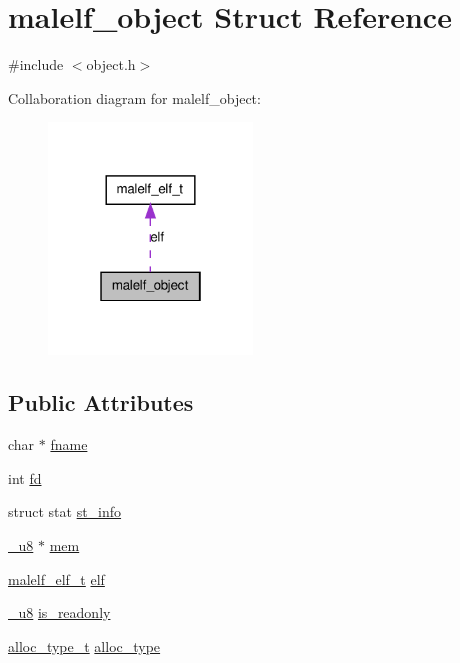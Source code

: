 \hypertarget{structmalelf__object}{
\section{malelf\_\-object Struct Reference}
\label{structmalelf__object}
}


{\ttfamily \#include $<$object.h$>$}



Collaboration diagram for malelf\_\-object:\nopagebreak
\begin{figure}[H]
\begin{center}
\leavevmode
\includegraphics[width=154pt]{structmalelf__object__coll__graph}
\end{center}
\end{figure}
\subsection*{Public Attributes}
\begin{DoxyCompactItemize}
\item 
char $\ast$ \hyperlink{structmalelf__object_a726458fb460f6a24831c86c8b38c0266}{fname}
\item 
int \hyperlink{structmalelf__object_ae97de1bc2fbeea9832e6a967953d2446}{fd}
\item 
struct stat \hyperlink{structmalelf__object_a33c04ec75fc3c04fb71c4df805338a40}{st\_\-info}
\item 
\hyperlink{types_8h_af2b0f13cffd24f6dddf794ae0c7472b4}{\_\-u8} $\ast$ \hyperlink{structmalelf__object_a8a910606f6b5bf327ba116b89b017887}{mem}
\item 
\hyperlink{structmalelf__elf__t}{malelf\_\-elf\_\-t} \hyperlink{structmalelf__object_aaed8855ad6d68c50f72ec6a9d61dcefb}{elf}
\item 
\hyperlink{types_8h_af2b0f13cffd24f6dddf794ae0c7472b4}{\_\-u8} \hyperlink{structmalelf__object_a3032145296090f7b882d44756596a18c}{is\_\-readonly}
\item 
\hyperlink{object_8h_a24f8376c4f2e7c8f8c023d1733ab02e9}{alloc\_\-type\_\-t} \hyperlink{structmalelf__object_a458bc33779f59e8534c7529cd6791043}{alloc\_\-type}
\end{DoxyCompactItemize}


